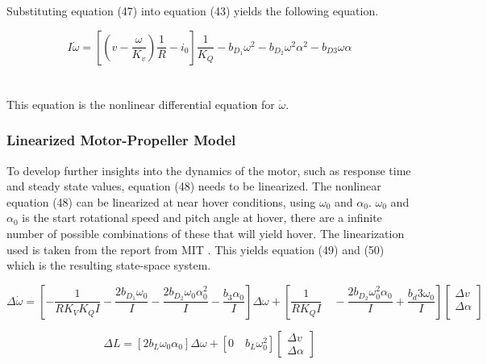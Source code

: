 Substituting equation (47) into equation (43) yields the following equation.

\begin{equation}
    I\dot{\omega} = \left[ \left(v - \frac{\omega}{K_v}\right) \frac{1}{R} - i_0 \right]\frac{1}{K_Q} - b_{D_1}\omega^2 - b_{D_2}\omega^2\alpha^2-b_{D3}\omega\alpha
\end{equation}
\\\\
This equation is the nonlinear differential equation for $\dot\omega$.


\newpage

\subsubsection{Linearized Motor-Propeller Model}

To develop further insights into the dynamics of the motor, such as response time and steady state values, equation (48) needs to be linearized. The nonlinear equation (48) can be linearized at near hover conditions, using $\omega_0$ and $\alpha_0$. $\omega_0$ and $\alpha_0$ is the start rotational speed and pitch angle at hover, there are a infinite number of possible combinations of these that will yield hover. The linearization used is taken from the report from MIT \cite{MITvpp}. This yields equation (49) and (50) which is the resulting state-space system. 

\begin{equation}
    \Delta\dot{\omega} = \left[-\frac{1}{RK_VK_QI}-\frac{2b_D_1\omega_0}{I}-\frac{2b_D_2\omega_0\alpha_0^2}{I}-\frac{b_3\alpha_0}{I}\right]\Delta\omega + \left[\frac{1}{RK_QI}\quad - \frac{2b_D_2\omega_0^2\alpha_0}{I} + \frac{b_d3\omega_0}{I}  \right] \begin{bmatrix}
       \Delta v            \\[0.2em]
       \Delta\alpha \\[0.2em]
     \end{bmatrix}
\end{equation}

\begin{equation}
    \Delta L = \left[2b_L\omega_0\alpha_0 \right]\Delta\omega + \left[0\quad b_L\omega_0^2\right]
    \begin{bmatrix}
        \Delta v \\
        \Delta\alpha
    \end{bmatrix}
\end{equation}


